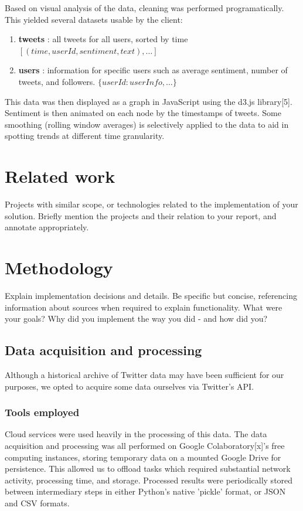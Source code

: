 \documentclass[12pt]{article}
\begin{document}
Based on visual analysis of the data, cleaning was performed programatically. This yielded several datasets usable by the client:
\begin{enumerate}
    \item \textbf{tweets} : all tweets for all users, sorted by time $[(time, userId, sentiment, text), \dots]$
    \item \textbf{users} : information for specific users such as average sentiment, number of tweets, and followers. $\{userId: userInfo, \dots\}$
\end{enumerate}

This data was then displayed as a graph in JavaScript using the d3.js library[5]. Sentiment is then animated on each node by the timestamps of tweets. Some smoothing (rolling window averages) is selectively applied to the data to aid in spotting trends at different time granularity.


\section{Related work}
Projects with similar scope, or technologies related to the implementation of your solution. Briefly mention the projects and their relation to your report, and annotate appropriately.

\section{Methodology}
Explain implementation decisions and details. Be specific but concise, referencing information about sources when required to explain functionality. What were your goals? Why did you implement the way you did - and how did you?\newline

\subsection{Data acquisition and processing}

Although a historical archive of Twitter data may have been sufficient for our purposes, we opted to acquire some data ourselves via Twitter's API.

\subsubsection{Tools employed}

Cloud services were used heavily in the processing of this data. The data acquisition and processing was all performed on Google Colaboratory[x]'s free computing instances, storing temporary data on a mounted Google Drive for persistence. This allowed us to offload tasks which required substantial network activity, processing time, and storage. Processed results were periodically stored between intermediary steps in either Python's native 'pickle' format, or JSON and CSV formats.\newline
\end{document}

